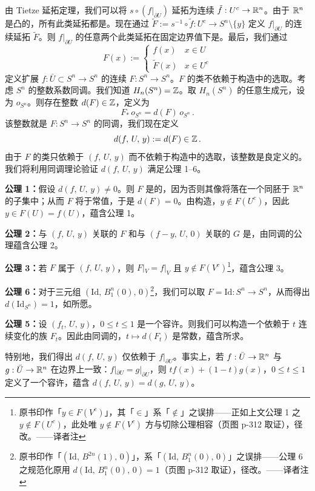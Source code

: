由 Tietze 延拓定理，我们可以将\trMapping{} $s\circ(f|_{\partial U})$ 延拓为连续\trMapping{} $\tilde{f}:U^c\to\mathbb{R}^n$。由于 $\mathbb{R}^n$ 是凸的，所有此类延拓都是\trHomotopic。现在通过 $\tilde{F}:=s^{-1}\circ\tilde{f}:U^c\to S^n\setminus\{y\}$ 定义 $f|_{\partial U}$ 的连续延拓 $\tilde{F}$。则 $f|_{\partial U}$ 的任意两个此类延拓在固定边界值下是\trHomotopic。最后，我们通过
\[F(x):=\begin{cases}f(x) & x\in U\\\tilde{F}(x) & x\in U^c\end{cases}\]
定义扩展 $f:\bar{U}\subset S^n\to S^n$ 的连续\trMapping{} $F:S^n\to S^n$。$F$ 的\trHomotopy{}类不依赖于构造中的选取。考虑 $S^{n}$ 的整数系数同调。我们知道 $H_n(S^n)=\mathbb{Z}$。取 $H_n(S^n)$ 的任意生成元，设为 $o_{S^n}$。则存在整数 $d(F)\in\mathbb{Z}$，定义为
\[F_*\,o_{S^n}=d(F)\,o_{S^n}\,.\]
该整数就是 $F:S^n\to S^n$ 的同调\trDegree{}，我们现在定义
\[d(f,\,U,\,y):=d(F)\in\mathbb{Z}\,.\]
由于 $F$ 的\trHomotopy{}类只依赖于 $(f,\,U,\,y)$ 而不依赖于构造中的选取，该整数是良定义的。我们将利用同调理论验证 $d(f,\,U,\,y)$ 满足公理 1--6。

\textbf{公理 1：}假设 $d(f,\,U,\,y)\neq 0$。则 $F$ 是\trSurjective{}的，因为否则其像将落在一个同胚于 $\mathbb{R}^n$ 的子集中；从而 $F$ 将\trHomotopic{}于常值\trMapping{}，于是 $d(F)=0$。由构造，$y\notin F(U^c)$，因此 $y\in F(U)=f(U)$，蕴含公理 1。

\textbf{公理 2：}与 $(f,\,U,\,y)$ 关联的 $F$ 和与 $(f-y,\,U,\,0)$ 关联的 $G$ 是\trHomotopic，由同调的\trHomotopy\trInvariance{}公理蕴含公理 2。

\textbf{公理 3：}若 $F$ 属于 $(f,\,U,\,y)$，则 $F|_{V}=f|_{V}$ 且 $y\notin F(V^c)$\footnote{原书印作「$y\in F(V^c)$」，其「$\in$」系「$\notin$」之误排——正如上文公理 1 之 $y\notin F(U^c)$，此处唯 $y\notin F(V^c)$ 方与切除公理相容（页图 p-312 取证），径改。——译者注}，蕴含公理 3。

\textbf{公理 6：}对于三元组 $(\mathrm{Id},\,B_1^n(0),\,0)$\footnote{原书印作「$(\mathrm{Id},\,B^{2n}(1),\,0)$」，系「$(\mathrm{Id},\,B_1^n(0),\,0)$」之误排——公理 6 之规范化原用 $d(\mathrm{Id},\,B_1^n(0),\,0)=1$（页图 p-312 取证），径改。——译者注}，我们可以取 $F=\mathrm{Id}:S^n\to S^n$，从而得出 $d(\mathrm{Id}_{S^n})=1$，如所愿。

\textbf{公理 5：}设 $(f_t,\,U,\,y)$，$0\leq t\leq 1$ 是一个容许\trHomotopy。则我们可以构造一个依赖于 $t$ 连续变化的族 $F_t$。因此由同调的\trHomotopy\trInvariance{}，$t\mapsto d(F_t)$ 是常数，蕴含所求。

特别地，我们得出 $d(f,\,U,\,y)$ 仅依赖于 $f|_{\partial U}$。事实上，若 $f:\bar{U}\to\mathbb{R}^n$ 与 $g:\bar{U}\to\mathbb{R}^n$ 在边界上一致：$f|_{\partial U}=g|_{\partial U}$，则 $tf(x)+(1-t)g(x)$，$0\leq t\leq 1$ 定义了一个容许\trHomotopy{}，蕴含 $d(f,\,U,\,y)=d(g,\,U,\,y)$。

